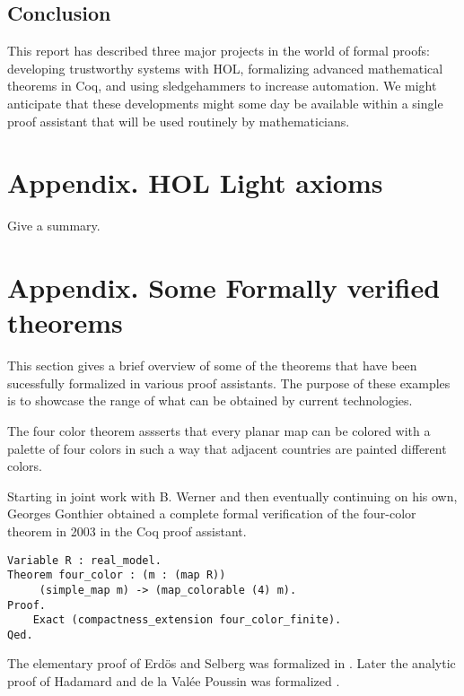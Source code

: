 \documentclass[brochure,english,12pt]{bourbaki}
\theoremstyle{plain}
\begin{document}
\subsection{Conclusion}

This report has described three major projects in the world of formal proofs:
developing trustworthy systems with HOL, formalizing advanced mathematical theorems
in Coq, and using sledgehammers to increase automation.  
We might anticipate that these developments might some day be available within a single proof assistant
that will be used routinely by mathematicians.


\section{Appendix. HOL Light axioms}

Give a summary.


\section{Appendix. Some Formally verified theorems}


This section gives a brief overview of some of the theorems that have been sucessfully formalized
in various proof assistants.  The purpose of these examples is to showcase the range
of what can be obtained by current technologies.


The four color theorem assserts that every planar map can be colored with a palette of four colors in such a way that adjacent
countries are painted different colors.

Starting in joint work with B. Werner and then eventually continuing on his own,
Georges Gonthier obtained a complete formal verification of the four-color theorem in 2003 in
the Coq proof assistant.

\begin{lstlisting}[keepspaces=true,stringstyle=\tt,basicstyle=\small,frame=single,framesep=8pt,morekeywords={Variable,Theorem,Proof,Qed},columns=flexible,caption={Four-color theorem in Coq}]
Variable R : real_model. 
Theorem four_color : (m : (map R))
     (simple_map m) -> (map_colorable (4) m). 
Proof.
    Exact (compactness_extension four_color_finite). 
Qed.
\end{lstlisting}


The elementary proof of Erd\"os and Selberg was formalized in \cite{XX}.  Later the analytic proof of Hadamard and de la Val\'ee Poussin
was formalized \cite{XX}.
\end{document}
